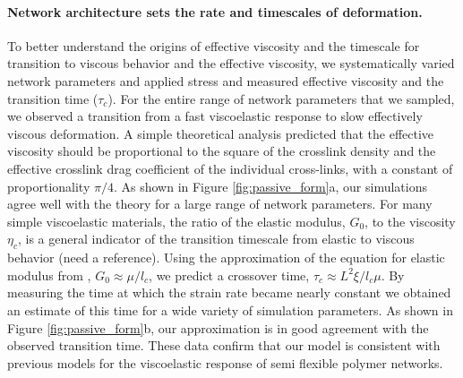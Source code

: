 \documentclass[10pt,letterpaper]{article}
\begin{document}
\paragraph{Network architecture sets the rate and timescales of deformation.}  To better understand the origins of effective viscosity and the timescale for transition to viscous behavior and the effective viscosity, we systematically varied network parameters and applied stress and measured effective viscosity and the transition time ($\tau_c$). For the entire range of network parameters that we sampled, we observed a transition from a fast viscoelastic response to slow effectively viscous deformation. A simple theoretical analysis predicted that the effective viscosity should be proportional to the square of the crosslink density and the effective crosslink drag coefficient of the individual cross-links, with a constant of proportionality $\pi/4$. As shown in Figure \ref{fig:passive_form}a, our simulations agree well with the theory for a large range of network parameters. For many simple viscoelastic materials, the ratio of the elastic modulus, $G_0$, to the viscosity $\eta_c$, is a general indicator of the transition timescale from elastic to viscous behavior (need a reference). Using the approximation of the equation for elastic modulus from \cite{theo_hlm}, $G_0 \approx \mu/l_c$, we predict a crossover time, $\tau_c \approx L^2\xi/l_c\mu$. By measuring the time at which the strain rate became nearly constant we obtained an estimate of this time for a wide variety of simulation parameters. As shown in Figure \ref{fig:passive_form}b, our approximation is in good agreement with the observed transition time. These data confirm that our model is consistent with previous models for the viscoelastic response of semi flexible polymer networks.
\end{document}
